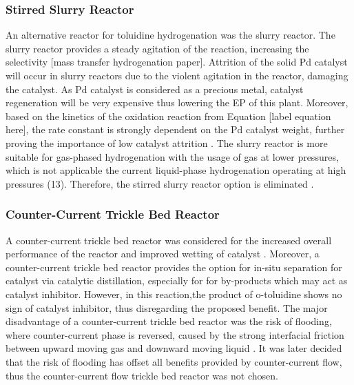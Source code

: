 \subsubsection{Stirred Slurry Reactor}
An alternative reactor for toluidine hydrogenation was the slurry reactor. The slurry reactor provides a steady agitation of the reaction, increasing the selectivity [mass transfer hydrogenation paper]. Attrition of the solid Pd catalyst will occur in slurry reactors due to the violent agitation in the reactor, damaging the catalyst. As Pd catalyst is considered as a precious metal, catalyst regeneration will be very expensive thus lowering the EP of this plant. Moreover, based on the kinetics of the oxidation reaction from Equation [label equation here], the rate constant is strongly dependent on the Pd catalyst weight, further proving the importance of low catalyst attrition \cite{rajadhyaksha_solvent_1986}.
The slurry reactor is more suitable for gas-phased hydrogenation with the usage of  gas at lower pressures, which is not applicable the current liquid-phase hydrogenation operating at high pressures (\SI{13}{\atm}). Therefore, the stirred slurry reactor option is eliminated \cite{ranade_chapter_2011}.

\subsubsection{Counter-Current Trickle Bed Reactor}
A counter-current trickle bed reactor was considered for the increased overall performance of the reactor and improved wetting of catalyst \cite{kundu_novel_2003}. Moreover, a counter-current trickle bed reactor provides the option for in-situ separation for catalyst via catalytic distillation, especially for for by-products which may act as catalyst inhibitor. However, in this reaction,the product of o-toluidine shows no sign of catalyst inhibitor, thus disregarding the proposed benefit. The major disadvantage of a counter-current trickle bed reactor was the risk of flooding, where counter-current phase is reversed, caused by the strong interfacial friction between upward moving gas and downward moving liquid \cite{breijer_prevention_2008}. It was later decided that the risk of flooding has offset all benefits provided by counter-current flow, thus the counter-current flow trickle bed reactor was not chosen. 


